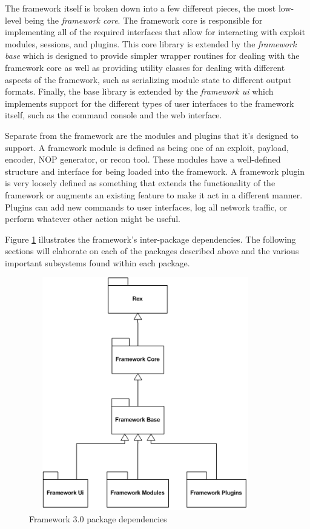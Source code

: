 \documentclass{report}
\begin{document}
\par
The framework itself is broken down into a few different pieces, the
most low-level being the \textit{framework core}.  The framework
core is responsible for implementing all of the required interfaces
that allow for interacting with exploit modules, sessions, and
plugins. This core library is extended by the \textit{framework
base} which is designed to provide simpler wrapper routines for
dealing with the framework core as well as providing utility classes
for dealing with different aspects of the framework, such as
serializing module state to different output formats.  Finally, the
base library is extended by the \textit{framework ui} which
implements support for the different types of user interfaces to the
framework itself, such as the command console and the web interface.

\par
Separate from the framework are the modules and plugins that it's
designed to support.  A framework module is defined as being one of
an exploit, payload, encoder, NOP generator, or recon tool. These
modules have a well-defined structure and interface for being loaded
into the framework.  A framework plugin is very loosely defined as
something that extends the functionality of the framework or
augments an existing feature to make it act in a different manner.
Plugins can add new commands to user interfaces, log all network
traffic, or perform whatever other action might be useful.

\par
Figure \ref{fig-arch-pkg} illustrates the framework's inter-package
dependencies.  The following sections will elaborate on each of the
packages described above and the various important subsystems found
within each package.

\begin{figure}[h]
\begin{center}
\includegraphics[height=4in,width=4in]{dev_guide_arch_packages}
\caption{Framework 3.0 package dependencies} \label{fig-arch-pkg}
\end{center}
\end{figure}
\end{document}
